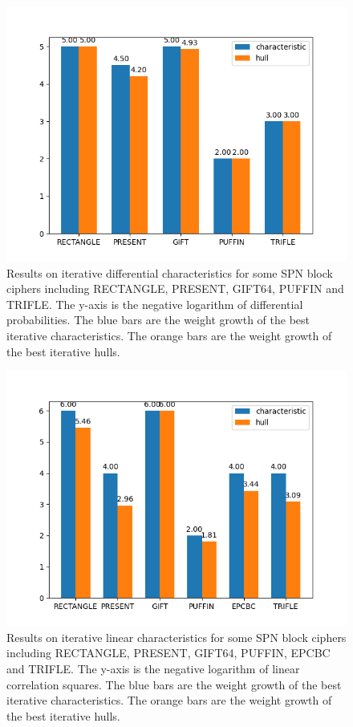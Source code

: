 \begin{figure}\label{fig:bar_ddt}
    \centering
    \caption{Results on iterative differential characteristics for some SPN block ciphers including RECTANGLE, PRESENT, GIFT64, PUFFIN and TRIFLE. The y-axis is the negative logarithm of differential probabilities. The blue bars are the weight growth of the best iterative characteristics. The orange bars are the weight growth of the best iterative hulls.}
	\includegraphics[width=1\textwidth]{fig/bar_ddt.png}
\end{figure}

\begin{figure}\label{fig:bar_lat2}
    \centering
    \caption{Results on iterative linear characteristics for some SPN block ciphers including RECTANGLE, PRESENT, GIFT64, PUFFIN, EPCBC and TRIFLE. The y-axis is the negative logarithm of linear correlation squares. The blue bars are the weight growth of the best iterative characteristics. The orange bars are the weight growth of the best iterative hulls.}
	\includegraphics[width=1\textwidth]{fig/bar_lat2.png}
\end{figure}

